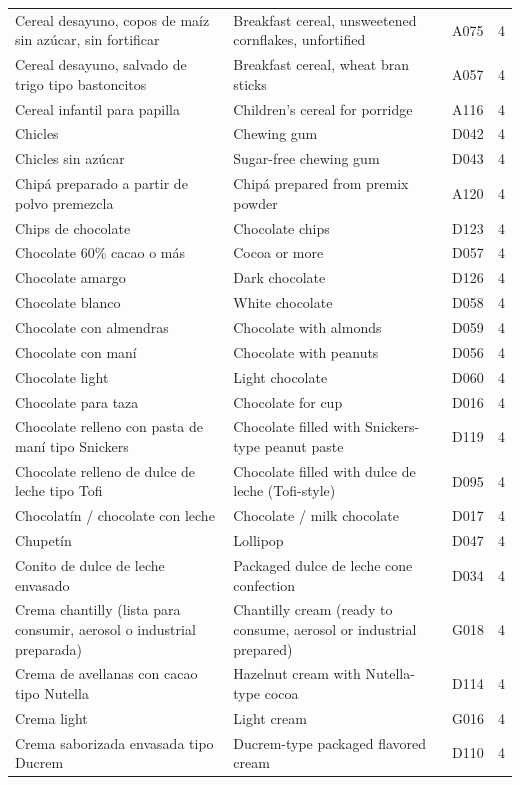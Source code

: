 {\begin{longtable}{p{4.3cm}p{5.5cm}p{1.5cm}p{0.7cm}}
Cereal desayuno, copos de maíz sin azúcar, sin fortificar & Breakfast cereal, unsweetened cornflakes, unfortified & A075 & 4\\
Cereal desayuno, salvado de trigo tipo bastoncitos & Breakfast cereal, wheat bran sticks & A057 & 4\\
Cereal infantil para papilla & Children's cereal for porridge & A116 & 4\\
Chicles & Chewing gum & D042 & 4\\
Chicles sin azúcar & Sugar-free chewing gum & D043 & 4\\
Chipá preparado a partir de polvo premezcla & Chipá prepared from premix powder & A120 & 4\\
Chips de chocolate & Chocolate chips & D123 & 4\\
Chocolate 60\% cacao o más & Cocoa or more & D057 & 4\\
Chocolate amargo & Dark chocolate & D126 & 4\\
Chocolate blanco & White chocolate & D058 & 4\\
Chocolate con almendras & Chocolate with almonds & D059 & 4\\
Chocolate con maní & Chocolate with peanuts & D056 & 4\\
Chocolate light & Light chocolate & D060 & 4\\
Chocolate para taza & Chocolate for cup & D016 & 4\\
Chocolate relleno con pasta de maní tipo Snickers & Chocolate filled with Snickers-type peanut paste & D119 & 4\\
Chocolate relleno de dulce de leche tipo Tofi & Chocolate filled with dulce de leche (Tofi-style) & D095 & 4\\
Chocolatín / chocolate con leche & Chocolate / milk chocolate & D017 & 4\\
Chupetín & Lollipop & D047 & 4\\
Conito de dulce de leche envasado & Packaged dulce de leche cone confection & D034 & 4\\
Crema chantilly (lista para consumir, aerosol o industrial preparada) & Chantilly cream (ready to consume, aerosol or industrial prepared) & G018 & 4\\
Crema de avellanas con cacao tipo Nutella & Hazelnut cream with Nutella-type cocoa & D114 & 4\\
Crema light & Light cream & G016 & 4\\
Crema saborizada envasada tipo Ducrem & Ducrem-type packaged flavored cream & D110 & 4\\

\end{longtable}}

